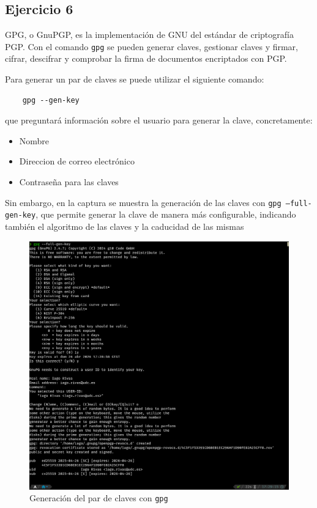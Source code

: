 \subsection{Ejercicio 6}
\graphicspath{ {img/06} }

GPG, o GnuPGP, es la implementación de GNU del estándar de criptografía PGP. Con el comando \texttt{gpg} se pueden generar claves, gestionar claves y firmar, cifrar, descifrar y comprobar la firma de documentos encriptados con PGP.

Para generar un par de claves se puede utilizar el siguiente comando:
\begin{verbatim}
    gpg --gen-key
\end{verbatim}

que preguntará información sobre el usuario para generar la clave, concretamente:
\begin{itemize}
    \item{Nombre}
    \item{Direccion de correo electrónico}
    \item{Contraseña para las claves}
\end{itemize}

Sin embargo, en la captura se muestra la generación de las claves con \texttt{gpg --full-gen-key}, que permite generar la clave de manera más configurable, indicando también el algoritmo de las claves y la caducidad de las mismas

\begin{figure}[H]
    \includegraphics[width=15cm]{gpg-genkey.png}
    \caption{Generación del par de claves con \texttt{gpg}}
\end{figure}

